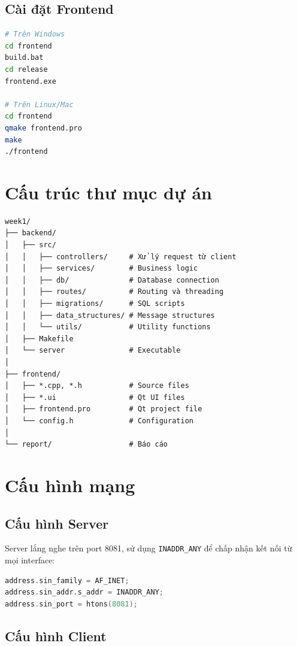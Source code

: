 ﻿\documentclass[12pt,a4paper]{report}
\begin{document}
\subsection{Cài đặt Frontend}

\begin{lstlisting}[language=bash]
# Trên Windows
cd frontend
build.bat
cd release
frontend.exe

# Trên Linux/Mac
cd frontend
qmake frontend.pro
make
./frontend
\end{lstlisting}

\section{Cấu trúc thư mục dự án}

\begin{verbatim}
week1/
├── backend/
│   ├── src/
│   │   ├── controllers/     # Xử lý request từ client
│   │   ├── services/        # Business logic
│   │   ├── db/              # Database connection
│   │   ├── routes/          # Routing và threading
│   │   ├── migrations/      # SQL scripts
│   │   ├── data_structures/ # Message structures
│   │   └── utils/           # Utility functions
│   ├── Makefile
│   └── server               # Executable
│
├── frontend/
│   ├── *.cpp, *.h           # Source files
│   ├── *.ui                 # Qt UI files
│   ├── frontend.pro         # Qt project file
│   └── config.h             # Configuration
│
└── report/                  # Báo cáo
\end{verbatim}

\section{Cấu hình mạng}

\subsection{Cấu hình Server}

Server lắng nghe trên port 8081, sử dụng \texttt{INADDR\_ANY} để chấp nhận kết nối từ mọi interface:

\begin{lstlisting}[language=C]
address.sin_family = AF_INET;
address.sin_addr.s_addr = INADDR_ANY;
address.sin_port = htons(8081);
\end{lstlisting}

\subsection{Cấu hình Client}
\end{document}
